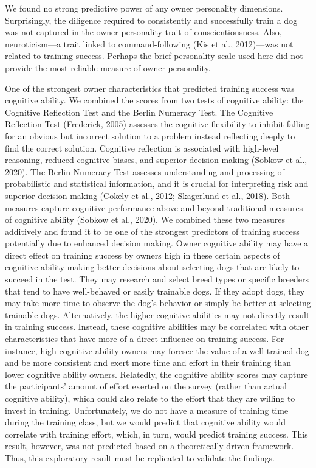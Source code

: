 \documentclass[
  english,
  ,pub,floatsintext]{apa6}
\begin{document}
We found no strong predictive power of any owner personality dimensions. Surprisingly, the diligence required to consistently and successfully train a dog was not captured in the owner personality trait of conscientiousness. Also, neuroticism---a trait linked to command-following (Kis et al., 2012)---was not related to training success. Perhaps the brief personality scale used here did not provide the most reliable measure of owner personality.

One of the strongest owner characteristics that predicted training success was cognitive ability. We combined the scores from two tests of cognitive ability: the Cognitive Reflection Test and the Berlin Numeracy Test. The Cognitive Reflection Test (Frederick, 2005) assesses the cognitive flexibility to inhibit falling for an obvious but incorrect solution to a problem instead reflecting deeply to find the correct solution. Cognitive reflection is associated with high-level reasoning, reduced cognitive biases, and superior decision making (Sobkow et al., 2020). The Berlin Numeracy Test assesses understanding and processing of probabilistic and statistical information, and it is crucial for interpreting risk and superior decision making (Cokely et al., 2012; Skagerlund et al., 2018). Both measures capture cognitive performance above and beyond traditional measures of cognitive ability (Sobkow et al., 2020). We combined these two measures additively and found it to be one of the strongest predictors of training success potentially due to enhanced decision making. Owner cognitive ability may have a direct effect on training success by owners high in these certain aspects of cognitive ability making better decisions about selecting dogs that are likely to succeed in the test. They may research and select breed types or specific breeders that tend to have well-behaved or easily trainable dogs. If they adopt dogs, they may take more time to observe the dog's behavior or simply be better at selecting trainable dogs. Alternatively, the higher cognitive abilities may not directly result in training success. Instead, these cognitive abilities may be correlated with other characteristics that have more of a direct influence on training success. For instance, high cognitive ability owners may foresee the value of a well-trained dog and be more consistent and exert more time and effort in their training than lower cognitive ability owners. Relatedly, the cognitive ability scores may capture the participants' amount of effort exerted on the survey (rather than actual cognitive ability), which could also relate to the effort that they are willing to invest in training. Unfortunately, we do not have a measure of training time during the training class, but we would predict that cognitive ability would correlate with training effort, which, in turn, would predict training success. This result, however, was not predicted based on a theoretically driven framework. Thus, this exploratory result must be replicated to validate the findings.
\end{document}
